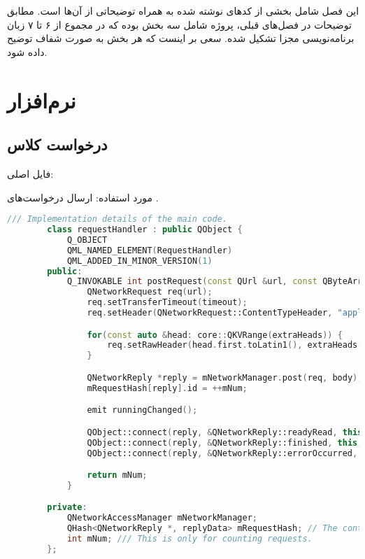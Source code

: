 
این فصل شامل بخشی از کد‌های نوشته شده به همراه توضیحاتی از آن‌ها است.
مطابق توضیحات در فصل‌های قبلی، پروژه شامل سه بخش بوده که در مجموع از ۶ تا ۷ زبان برنامه‌نویسی مجزا تشکیل شده.
سعی بر اینست که هر بخش به صورت شفاف توضیح داده شود.
\section{نرم‌افزار}
\subsection{درخواست  کلاس }
فایل اصلی:
\hyperref{https://github.com/cardianco/cardian/blob/master/cardian/requesthandler.h}{}{}{}

مورد استفاده: ‌ارسال درخواست‌های .
\begin{latin}
	\small
	\begin{lstlisting}[language=C++, caption={C++ Request Handler Component}]
		/// Implementation details of the main code.
		class requestHandler : public QObject {
			Q_OBJECT
			QML_NAMED_ELEMENT(RequestHandler)
			QML_ADDED_IN_MINOR_VERSION(1)
		public:
			Q_INVOKABLE int postRequest(const QUrl &url, const QByteArray &body, const QVariantMap &extraHeads = QVariantMap(), int timeout = DefaultTransferTimeoutConstant) {
				QNetworkRequest req(url);
				req.setTransferTimeout(timeout);
				req.setHeader(QNetworkRequest::ContentTypeHeader, "application/json");

				for(const auto &head: core::QKVRange(extraHeads)) {
					req.setRawHeader(head.first.toLatin1(), extraHeads[head.first].toByteArray());
				}

				QNetworkReply *reply = mNetworkManager.post(req, body);
				mRequestHash[reply].id = ++mNum;

				emit runningChanged();

				QObject::connect(reply, &QNetworkReply::readyRead, this, &requestHandler::onReadyRead);
				QObject::connect(reply, &QNetworkReply::finished, this, &requestHandler::onFinished);
				QObject::connect(reply, &QNetworkReply::errorOccurred, this, &requestHandler::onErrorOccurred);

				return mNum;
			}

		private:
			QNetworkAccessManager mNetworkManager;
			QHash<QNetworkReply *, replyData> mRequestHash; // The container used for holding each request
			int mNum; /// This is only for counting requests.
		};
	\end{lstlisting}
\end{latin}

